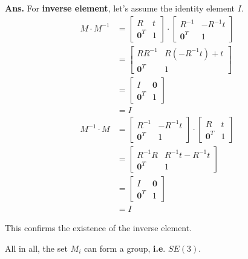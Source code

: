 \documentclass[12pt, a4paper, UTF8, fontset=windows]{ctexbook}
\newenvironment{solution}{\par\noindent\textbf{Ans.}}{\par}
\begin{document}
\begin{solution}
    For \textbf{inverse element}, let's assume the identity element $I$. 
    $$
    \begin{aligned}
    M \cdot M^{-1} &= \begin{bmatrix}
    R & t \\
    \mathbf{0}^T & 1
    \end{bmatrix} \cdot \begin{bmatrix}
    R^{-1} & -R^{-1}t \\
    \mathbf{0}^T & 1
    \end{bmatrix} \\
    &= \begin{bmatrix}
    RR^{-1} & R(-R^{-1}t) + t \\
    \mathbf{0}^T & 1
    \end{bmatrix} \\
    &= \begin{bmatrix}
    I & \mathbf{0} \\
    \mathbf{0}^T & 1
    \end{bmatrix} \\
    &= I
    \end{aligned}
    $$
    $$
    \begin{aligned}
    M^{-1} \cdot M &= \begin{bmatrix}
    R^{-1} & -R^{-1}t \\
    \mathbf{0}^T & 1
    \end{bmatrix} \cdot \begin{bmatrix}
    R & t \\
    \mathbf{0}^T & 1
    \end{bmatrix} \\
    &= \begin{bmatrix}
    R^{-1}R & R^{-1}t - R^{-1}t \\
    \mathbf{0}^T & 1
    \end{bmatrix} \\
    &= \begin{bmatrix}
    I & \mathbf{0} \\
    \mathbf{0}^T & 1
    \end{bmatrix} \\
    &= I
    \end{aligned}
    $$

    This confirms the existence of the inverse element.

    All in all, the set $M_i$ can form a group, \textbf{i.e}. $SE(3)$.
\end{solution}
\end{document}
